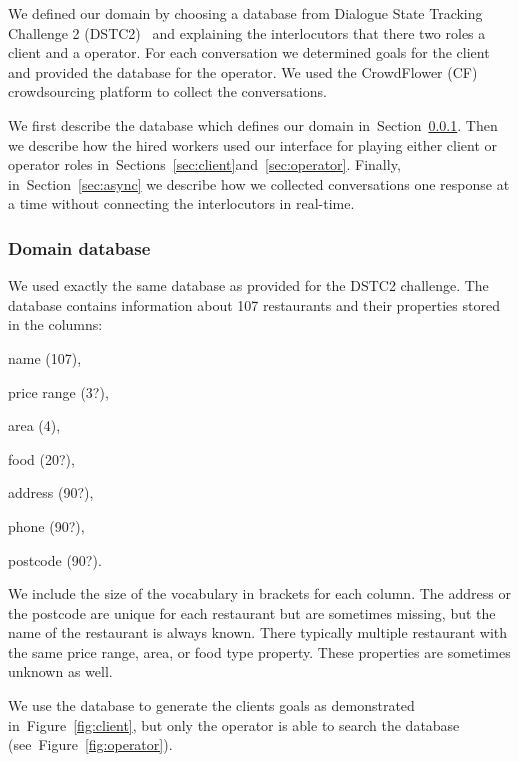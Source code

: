 \documentclass[runningheads,a4paper]{llncs}
\begin{document}
We defined our domain by choosing a database from Dialogue State Tracking Challenge 2 (DSTC2)~\cite{henderson2014dstc2} and explaining the interlocutors that there two roles a client and a operator.
For each conversation we determined goals for the client and provided the database for the operator.
We used the CrowdFlower (CF) crowdsourcing platform to collect the conversations.

We first describe the database which defines our domain in~Section~\ref{sec:db}.
Then we describe how the hired workers used our interface for playing either client or operator roles in~Sections~\ref{sec:client}and~\ref{sec:operator}.
Finally, in~Section~\ref{sec:async} we describe how we collected conversations one response at a time without connecting the interlocutors in real-time. 

\subsubsection{Domain database}
\label{sec:db}

We used exactly the same database as provided for the DSTC2 challenge.
The database contains information about 107 restaurants and their properties stored in the columns:

\begin{inparaenum}
    \item name (107),
    \item price range (3?),
    \item area (4),
    \item food (20?),
    \item address (90?),
    \item phone (90?),
    \item postcode (90?).
\end{inparaenum}

We include the size of the vocabulary in brackets for each column.
The address or the postcode are unique for each restaurant but are sometimes missing, but the name of the restaurant is always known. 
There typically multiple restaurant with the same price range, area, or food type property.
These properties are sometimes unknown as well.

We use the database to generate the clients goals as demonstrated in~Figure~\ref{fig:client}, but only the operator is able to search the database (see~Figure~\ref{fig:operator}).
\end{document}

